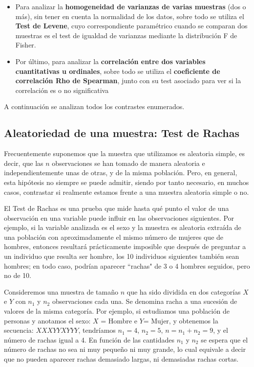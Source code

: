 \begin{itemize}
\item Para analizar la \textbf{homogeneidad de varianzas de varias muestras} (dos o más), sin tener en cuenta la normalidad de los datos,
sobre todo se utiliza el \textbf{Test de Levene}, cuyo correspondiente paramétrico cuando se comparan dos muestras es el test de igualdad de
varianzas mediante la distribución F de Fisher.

\item Por último, para analizar la \textbf{correlación entre dos variables cuantitativas u ordinales}, sobre todo se utiliza el
\textbf{coeficiente de correlación Rho de Spearman}, junto con su test asociado para ver si la correlación es o no significativa
\end{itemize}

A continuación se analizan todos los contrastes enumerados.

\subsection{Aleatoriedad de una muestra: Test de Rachas}
Frecuentemente suponemos que la muestra que utilizamos es aleatoria simple, es decir, que las  $n$  observaciones se han tomado de manera
aleatoria e independientemente unas de otras, y de la misma población. Pero, en general, esta hipótesis no siempre se puede admitir, siendo
por tanto necesario, en muchos casos, contrastar si realmente estamos frente a una muestra aleatoria simple o no.

El Test de Rachas es una prueba que mide hasta qué punto el valor de una observación en una variable puede influir en las observaciones
siguientes. Por ejemplo, si la variable analizada es el sexo y la muestra es aleatoria extraída de una población con aproximadamente el
mismo número de mujeres que de hombres, entonces resultará prácticamente imposible que después de preguntar a un individuo que resulta ser
hombre, los 10 individuos siguientes también sean hombres; en todo caso, podrían aparecer ``rachas" de 3 o 4 hombres seguidos, pero no de
10.

Consideremos una muestra de tamaño $n$ que ha sido dividida en dos categorías $X$ e $Y$ con $n_{1}$ y $n_{2}$ observaciones cada una. Se
denomina racha a una sucesión de valores de la misma categoría. Por ejemplo, si estudiamos una población de personas y anotamos el sexo: $X$
= Hombre e $Y$= Mujer, y obtenemos la secuencia: $X X X Y Y X Y Y Y$, tendríamos $n_{1}=4$, $n_{2}=5$, $n=n_{1}+n_{2}=9$, y el número de
rachas igual a 4. En función de las cantidades $n_{1}$ y $n_{2}$ se espera que el número de rachas no sea ni muy pequeño ni muy grande, lo
cual equivale a decir que no pueden aparecer rachas demasiado largas, ni demasiadas rachas cortas.

